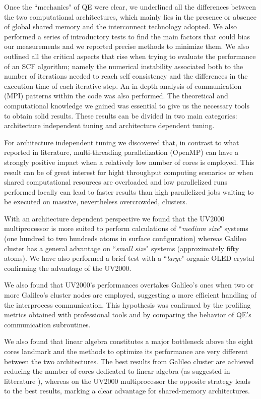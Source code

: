 \documentclass[a4paper,10pt]{article}
\begin{document}
Once the ``mechanics" of QE were clear, we underlined all the differences between the two computational architectures, which mainly lies in the presence or absence of global shared memory and the interconnect technology adopted\cite{Tanenbaum}.
We also performed a series of introductory tests to find the main factors that could bias our measurements and we reported precise methods to minimize them. 
We also outlined all the critical aspects that rise when trying to evaluate the performance of an SCF algorithm; namely the numerical instability associated both to the number of iterations needed to reach self consistency and the differences in the execution time of each iterative step.
An in-depth analysis of communication (MPI) patterns within the code was also performed.
The theoretical and computational knowledge we gained was essential to give us the necessary tools to obtain solid results. 
These results can be divided in two main categories: architecture independent tuning and architecture dependent tuning.

For architecture independent tuning we discovered that, in contrast to what reported in literature, multi-threading parallelization (OpenMP) can have a strongly positive impact when a relatively low number of cores is employed.
This result can be of great interest for hight throughput computing scenarios or when shared computational resources are overloaded and low parallelized runs performed locally can lead to faster results than high parallelized jobs waiting to be executed on massive, nevertheless overcrowded, clusters.

With an architecture dependent perspective we found that the UV2000 multiprocessor is more suited to perform calculations of ``\textit{medium size}" systems\cite{Titania1}\cite{prace} (one hundred to two hundreds atoms in surface configuration) whereas Galileo cluster has a general advantage on ``\textit{small size}" systems (approximately fifty atoms).
We have also performed a brief test with a ``\textit{large}" organic OLED crystal confirming the advantage of the UV2000.

We also found that UV2000's performances overtakes Galileo's ones when two or more Galileo's cluster nodes are employed, suggesting a more efficient handling of the interprocess communication. 
This hypothesis was confirmed by the profiling metrics obtained with professional tools and by comparing the behavior of QE's communication subroutines.

We also found that linear algebra constitutes a major bottleneck above the eight cores landmark and the methods to optimize its performance are very different between the two architectures.
The best results from Galileo cluster are achieved reducing the number of cores dedicated to linear algebra (as suggested in litterature \cite{QE2}), whereas on the UV2000 multiprocessor the opposite strategy leads to the best results, marking a clear advantage for shared-memory architectures.
\end{document}
